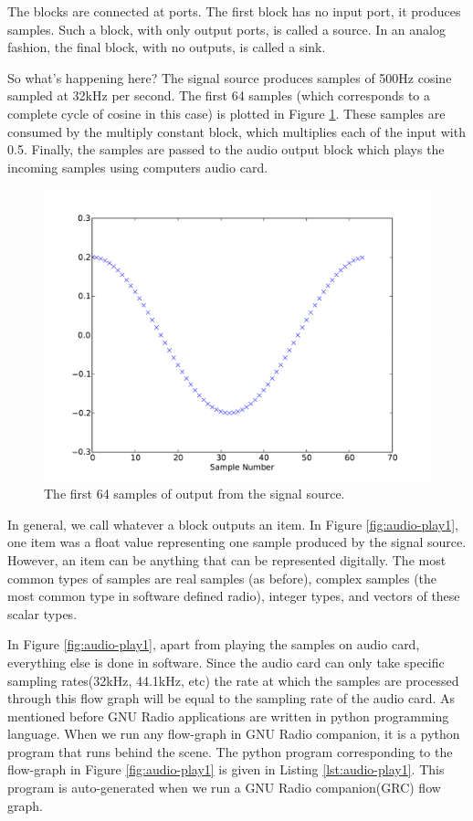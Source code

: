 \documentclass[a4paper,10pt]{article}
\begin{document}
The blocks are connected at ports. 
The first block has no input port, it produces samples. 
Such a block, with only output ports, is called a source. 
In an analog fashion, the final block, with no outputs, is called a sink.

So what's happening here?
The signal source produces samples of 500Hz cosine sampled at 32kHz per second.
The first 64 samples (which corresponds to a complete cycle of cosine in this case)
is plotted in Figure \ref{fig:signal-source-out}.
These samples are consumed by the multiply constant block,
which multiplies each of the input with 0.5.
Finally, the samples are passed to the audio output block which plays the incoming samples using computers audio card.
\begin{figure}
 \centering
 \includegraphics[scale=0.4]{figures/signal-source-out}
 \caption{The first 64 samples of output from the signal source. \label{fig:signal-source-out}}
\end{figure}

In general, we call whatever a block outputs an item. 
In Figure \ref{fig:audio-play1}, one item was a float value representing one sample produced by the signal source. 
However, an item can be anything that can be represented digitally. 
The most common types of samples are real samples (as before), complex samples (the most common type in software defined radio), integer types, and vectors of these scalar types.

In Figure \ref{fig:audio-play1}, apart from playing the samples on audio card, everything else is done in software.
Since the audio card can only take specific sampling rates(32kHz, 44.1kHz, etc)
the rate at which the samples are processed through this flow graph will be equal to the sampling rate of the audio card.
As mentioned before GNU Radio applications are written in python programming language. When we run any flow-graph
in GNU Radio companion, it is a python program that runs behind the scene. The python program corresponding to 
the flow-graph in Figure \ref{fig:audio-play1} is given in Listing \ref{lst:audio-play1}.
This program is auto-generated when we run a GNU Radio companion(GRC) flow graph.
\end{document}

